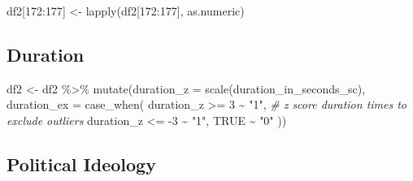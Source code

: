 \documentclass[
]{article}
\newenvironment{Shaded}{\begin{snugshade}}{\end{snugshade}}
\newcommand{\AttributeTok}[1]{\textcolor[rgb]{0.77,0.63,0.00}{#1}}
\newcommand{\CommentTok}[1]{\textcolor[rgb]{0.56,0.35,0.01}{\textit{#1}}}
\newcommand{\ConstantTok}[1]{\textcolor[rgb]{0.00,0.00,0.00}{#1}}
\newcommand{\DecValTok}[1]{\textcolor[rgb]{0.00,0.00,0.81}{#1}}
\newcommand{\FunctionTok}[1]{\textcolor[rgb]{0.00,0.00,0.00}{#1}}
\newcommand{\NormalTok}[1]{#1}
\newcommand{\OtherTok}[1]{\textcolor[rgb]{0.56,0.35,0.01}{#1}}
\newcommand{\SpecialCharTok}[1]{\textcolor[rgb]{0.00,0.00,0.00}{#1}}
\newcommand{\StringTok}[1]{\textcolor[rgb]{0.31,0.60,0.02}{#1}}
\begin{document}
\begin{Shaded}
\begin{Highlighting}[]
\NormalTok{df2[}\DecValTok{172}\SpecialCharTok{:}\DecValTok{177}\NormalTok{] }\OtherTok{\textless{}{-}} \FunctionTok{lapply}\NormalTok{(df2[}\DecValTok{172}\SpecialCharTok{:}\DecValTok{177}\NormalTok{], as.numeric)}
\end{Highlighting}
\end{Shaded}

\hypertarget{duration}{%
\subsection{Duration}\label{duration}}

\begin{Shaded}
\begin{Highlighting}[]
\NormalTok{df2 }\OtherTok{\textless{}{-}}\NormalTok{ df2 }\SpecialCharTok{\%\textgreater{}\%} 
  \FunctionTok{mutate}\NormalTok{(}\AttributeTok{duration\_z =} \FunctionTok{scale}\NormalTok{(duration\_in\_seconds\_sc),}
         \AttributeTok{duration\_ex =} \FunctionTok{case\_when}\NormalTok{(}
\NormalTok{           duration\_z }\SpecialCharTok{\textgreater{}=} \DecValTok{3} \SpecialCharTok{\textasciitilde{}} \StringTok{"1"}\NormalTok{, }\CommentTok{\# z score duration times to exclude outliers}
\NormalTok{           duration\_z }\SpecialCharTok{\textless{}=} \SpecialCharTok{{-}}\DecValTok{3} \SpecialCharTok{\textasciitilde{}} \StringTok{"1"}\NormalTok{,}
           \ConstantTok{TRUE} \SpecialCharTok{\textasciitilde{}} \StringTok{"0"}
\NormalTok{         ))}
\end{Highlighting}
\end{Shaded}

\hypertarget{political-ideology}{%
\subsection{Political Ideology}\label{political-ideology}}
\end{document}
